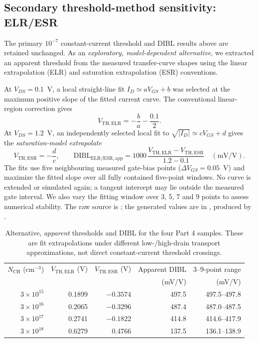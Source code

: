 \subsection{Secondary threshold-method sensitivity: ELR/ESR}
The primary $10^{-7}$ constant-current threshold and DIBL results
above are retained unchanged. As an \emph{exploratory, model-dependent
alternative}, we extracted an apparent threshold from the measured
transfer-curve shapes using the linear extrapolation (ELR) and
saturation extrapolation (ESR) conventions.

At $V_{DS}=0.1$~V, a local straight-line fit
$I_D \simeq aV_{GS}+b$ was selected at the maximum
positive slope of the fitted current curve. The conventional
linear-region correction gives
\[
V_{\mathrm{TH,ELR}}=-\frac{b}{a}-\frac{0.1}{2}.
\]
At $V_{DS}=1.2$~V, an independently selected local fit to
$\sqrt{|I_D|}\simeq cV_{GS}+d$ gives the
\emph{saturation-model extrapolate}
\[
V_{\mathrm{TH,ESR}}=-\frac{d}{c},\qquad
\mathrm{DIBL}_{\mathrm{ELR/ESR,app}}=
1000\,\frac{V_{\mathrm{TH,ELR}}-V_{\mathrm{TH,ESR}}}
{1.2-0.1}\quad(\mathrm{mV/V}).
\]
The fits use five neighbouring measured gate-bias points
($\Delta V_{GS}=0.05$~V) and maximize the fitted slope
over all fully contained five-point windows. No curve is
extended or simulated again; a tangent intercept may lie
outside the measured gate interval. We also vary the fitting
window over 3, 5, 7 and 9 points to assess numerical stability.
The raw source is ;
the generated values are in
, produced by
.

\begin{table}[H]\centering\small
\caption{Alternative, \emph{apparent} thresholds and DIBL for
the four Part 4 samples. These are fit extrapolations under
different low-/high-drain transport approximations, not
direct constant-current threshold crossings.}
\begin{tabular}{@{}rrrrr@{}}\toprule
$N_{\mathrm{CH}}$ (cm$^{-3}$) &
$V_{\mathrm{TH,ELR}}$ (V) &
$V_{\mathrm{TH,ESR}}$ (V) &
Apparent DIBL & 3--9-point range\\
&&& (mV/V) & (mV/V)\\\midrule
$3\times10^{15}$ & 0.1899 & $-0.3574$ & 497.5 & 497.5--497.8\\
$3\times10^{16}$ & 0.2065 & $-0.3296$ & 487.4 & 487.0--487.5\\
$3\times10^{17}$ & 0.2741 & $-0.1822$ & 414.8 & 414.6--417.9\\
$3\times10^{18}$ & 0.6279 & 0.4766 & 137.5 & 136.1--138.9\\
\bottomrule\end{tabular}
\end{table}

